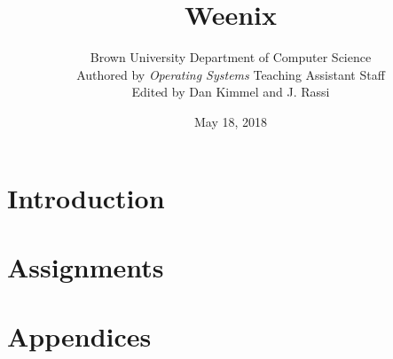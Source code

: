 \documentclass{book}
\title{\bf Weenix}
\author{Brown University Department of Computer Science \\ Authored by \textit{Operating Systems} Teaching Assistant Staff \\ Edited by Dan Kimmel and J. Rassi}
\begin{document}
    \date{May 18, 2018}
    \maketitle
    \tableofcontents
	\part{Introduction}
        
        
    \part{Assignments}
        
        
        
        
        
    \part{Appendices}
        \appendix
        
        
        
\end{document}
